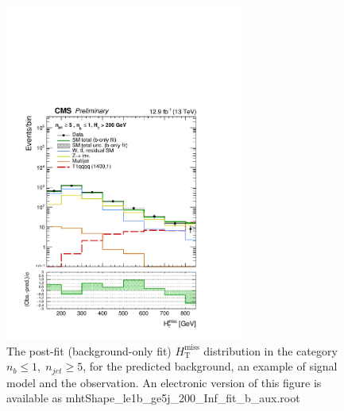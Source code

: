 \begin{figure}[tbhp]
    \caption{ 
    The post-fit (background-only fit) $H_{\mathrm{T}}^{\mathrm{miss}}$ distribution in the category $n_{b}\leq 1, \; n_{jet} \geq 5$, 
    for the predicted background, an example of signal model and the observation.
    An electronic version of this figure is available as mhtShape\_le1b\_ge5j\_200\_Inf\_fit\_b\_aux.root
    \label{fig:mhtShape_le1b_ge5j_fit_b} }
  \begin{center}
  \includegraphics[width=0.7\textwidth]{mhtShape_le1b_ge5j_200_Inf_fit_b_aux}
  \end{center}
\end{figure}


